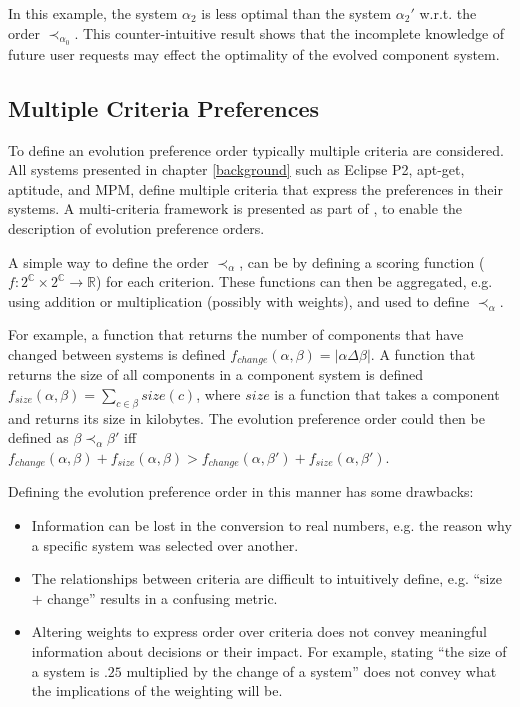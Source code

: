 In this example, the system $\alpha_2$ is less optimal than the system $\alpha_2'$ w.r.t. the order $\prec_{\alpha_0}$.
This counter-intuitive result shows that the incomplete knowledge of future user requests may effect the optimality of the evolved component system.

\subsection{Multiple Criteria Preferences}
\label{formal.opt}
To define an evolution preference order typically multiple criteria are considered. 
All systems presented in chapter \ref{background} such as Eclipse P2, apt-get, aptitude, and MPM, define multiple criteria that express the preferences in their systems.
A multi-criteria framework is presented as part of \modelname, to enable the description of evolution preference orders. 

A simple way to define the order $\prec_{\alpha}$, can be by defining a scoring function ($f: 2^{\mathbb{C}} \times 2^{\mathbb{C}} \rightarrow \mathbb{R}$) for each criterion. 
These functions can then be aggregated, e.g. using addition or multiplication (possibly with weights), and used to define $\prec_{\alpha}$.

For example, a function that returns the number of components that have changed between systems is defined $f_{change}(\alpha,\beta) = |\alpha \Delta \beta|$.
A function that returns the size of all components in a component system is defined $f_{size}(\alpha,\beta) = \sum \limits_{c \in \beta} size(c)$,
 where $size$ is a function that takes a component and returns its size in kilobytes.
The evolution preference order could then be defined as $\beta \prec_{\alpha} \beta'$ iff $f_{change}(\alpha,\beta) + f_{size}(\alpha,\beta) > f_{change}(\alpha,\beta') + f_{size}(\alpha,\beta')$.

Defining the evolution preference order in this manner has some drawbacks:
\begin{itemize}
  \item Information can be lost in the conversion to real numbers, e.g. the reason why a specific system was selected over another.
  \item The relationships between criteria are difficult to intuitively define, e.g. ``size $+$ change'' results in a confusing metric.
  \item Altering weights to express order over criteria does not convey meaningful information about decisions or their impact.
  For example, stating ``the size of a system is $.25$ multiplied by the change of a system'' does not convey what the implications of the weighting will be.
\end{itemize}

